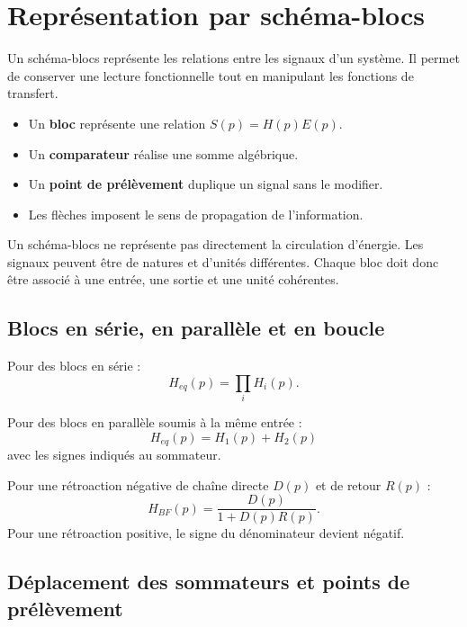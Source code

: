 
\section{Représentation par schéma-blocs}\label{sec:sa-schema-blocs}

Un schéma-blocs représente les relations entre les signaux d'un système. Il permet de conserver une lecture fonctionnelle tout en manipulant les fonctions de transfert.

\SASchemaElementsBase

\begin{itemize}
  \item Un \textbf{bloc} représente une relation $S(p)=H(p)E(p)$.
  \item Un \textbf{comparateur} réalise une somme algébrique.
  \item Un \textbf{point de prélèvement} duplique un signal sans le modifier.
  \item Les flèches imposent le sens de propagation de l'information.
\end{itemize}

\begin{SAattention}
Un schéma-blocs ne représente pas directement la circulation d'énergie. Les signaux peuvent être de natures et d'unités différentes. Chaque bloc doit donc être associé à une entrée, une sortie et une unité cohérentes.
\end{SAattention}

\subsection{Blocs en série, en parallèle et en boucle}

\TLReglesBlocs

Pour des blocs en série :
\[
H_{eq}(p)=\prod_i H_i(p).
\]

Pour des blocs en parallèle soumis à la même entrée :
\[
H_{eq}(p)=H_1(p)+H_2(p)
\]
avec les signes indiqués au sommateur.

Pour une rétroaction négative de chaîne directe $D(p)$ et de retour $R(p)$ :
\[
\boxed{H_{BF}(p)=\frac{D(p)}{1+D(p)R(p)}}.
\]
Pour une rétroaction positive, le signe du dénominateur devient négatif.

\subsection{Déplacement des sommateurs et points de prélèvement}

